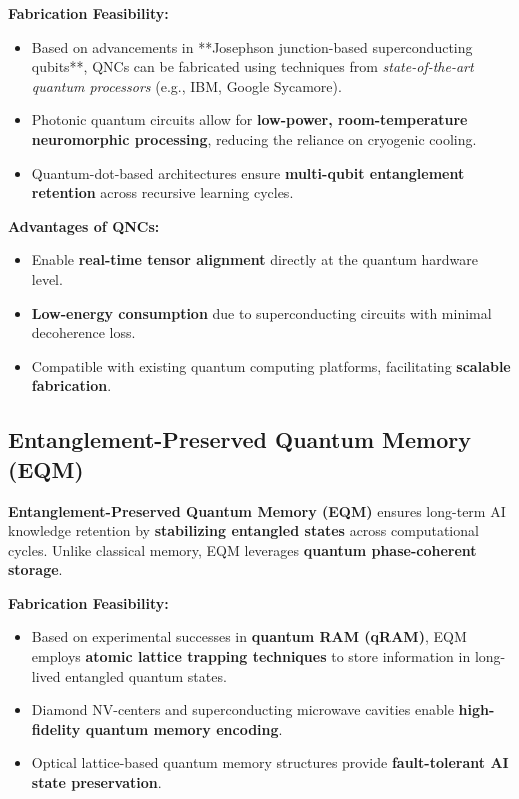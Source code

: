 \documentclass{article}
\theoremstyle{plain}
\begin{document}
\noindent \textbf{Fabrication Feasibility:}
\begin{itemize}
    \item Based on advancements in **Josephson junction-based superconducting qubits**, QNCs can be fabricated using techniques from \textit{state-of-the-art quantum processors} (e.g., IBM, Google Sycamore).
    \item Photonic quantum circuits allow for \textbf{low-power, room-temperature neuromorphic processing}, reducing the reliance on cryogenic cooling.
    \item Quantum-dot-based architectures ensure \textbf{multi-qubit entanglement retention} across recursive learning cycles.
\end{itemize}

\noindent \textbf{Advantages of QNCs:}
\begin{itemize}
    \item Enable \textbf{real-time tensor alignment} directly at the quantum hardware level.
    \item \textbf{Low-energy consumption} due to superconducting circuits with minimal decoherence loss.
    \item Compatible with existing quantum computing platforms, facilitating \textbf{scalable fabrication}.
\end{itemize}

\subsection{Entanglement-Preserved Quantum Memory (EQM)}

\textbf{Entanglement-Preserved Quantum Memory (EQM)} ensures long-term AI knowledge retention by \textbf{stabilizing entangled states} across computational cycles. Unlike classical memory, EQM leverages \textbf{quantum phase-coherent storage}.

\noindent \textbf{Fabrication Feasibility:}
\begin{itemize}
    \item Based on experimental successes in \textbf{quantum RAM (qRAM)}, EQM employs \textbf{atomic lattice trapping techniques} to store information in long-lived entangled quantum states.
    \item Diamond NV-centers and superconducting microwave cavities enable \textbf{high-fidelity quantum memory encoding}.
    \item Optical lattice-based quantum memory structures provide \textbf{fault-tolerant AI state preservation}.
\end{itemize}
\end{document}
